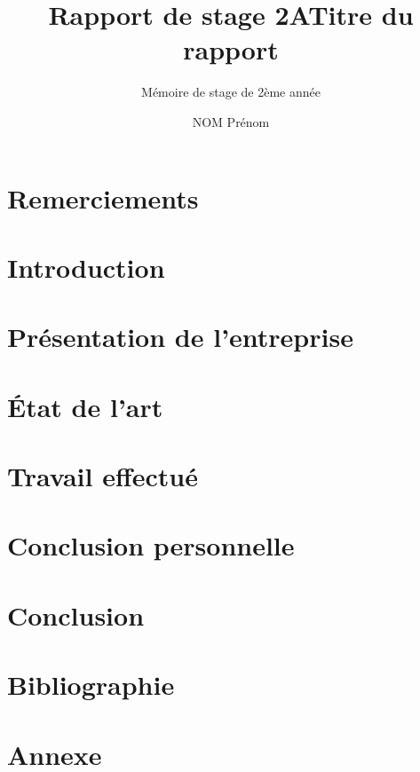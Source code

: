 \documentclass{rapport de stage}
\title{Rapport de stage 2A} %
\title{Titre du rapport}
\subtitle{Mémoire de stage de 2ème année}
\author{NOM Prénom}
\begin{document}
\maketitle

\section{Remerciements}

\newpage



\newpage

\toc %



\section{Introduction}

\newpage


\section{Présentation de l'entreprise}

\newpage


\section{État de l'art}

\newpage


\section{Travail effectué}

\newpage


\section{Conclusion personnelle}

\newpage


\section{Conclusion} 

\newpage


\section{Bibliographie}

\newpage


\section{Annexe}

\newpage
\end{document}
